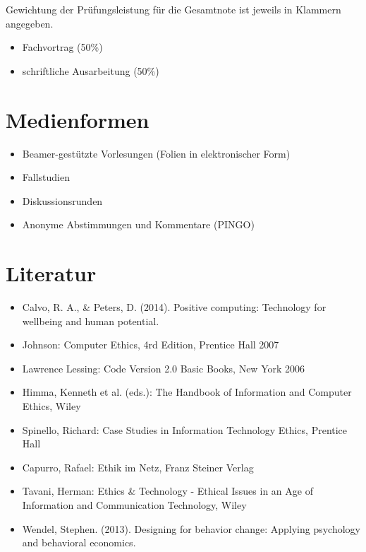Gewichtung der Prüfungsleistung für die Gesamtnote ist jeweils in
Klammern angegeben.

\begin{itemize}
\tightlist
\item
  Fachvortrag (50\%)
\item
  schriftliche Ausarbeitung (50\%)
\end{itemize}

\section*{Medienformen\label{/mi-2017/modulbeschreibungen-master/MA_All_Computerethik}}\label{medienformenpathlabelmi-2017modulbeschreibungen-mastermaux5fallux5fcomputerethik}

\begin{itemize}
\tightlist
\item
  Beamer-gestützte Vorlesungen (Folien in elektronischer Form)
\item
  Fallstudien
\item
  Diskussionsrunden
\item
  Anonyme Abstimmungen und Kommentare (PINGO)
\end{itemize}

\section*{Literatur\label{/mi-2017/modulbeschreibungen-master/MA_All_Computerethik}}\label{literaturpathlabelmi-2017modulbeschreibungen-mastermaux5fallux5fcomputerethik}

\begin{itemize}
\tightlist
\item
  Calvo, R. A., \& Peters, D. (2014). Positive computing: Technology for
  wellbeing and human potential.
\item
  Johnson: Computer Ethics, 4rd Edition, Prentice Hall 2007
\item
  Lawrence Lessing: Code Version 2.0 Basic Books, New York 2006
\item
  Himma, Kenneth et al. (eds.): The Handbook of Information and Computer
  Ethics, Wiley
\item
  Spinello, Richard: Case Studies in Information Technology Ethics,
  Prentice Hall
\item
  Capurro, Rafael: Ethik im Netz, Franz Steiner Verlag
\item
  Tavani, Herman: Ethics \& Technology - Ethical Issues in an Age of
  Information and Communication Technology, Wiley
\item
  Wendel, Stephen. (2013). Designing for behavior change: Applying
  psychology and behavioral economics.
\end{itemize}

